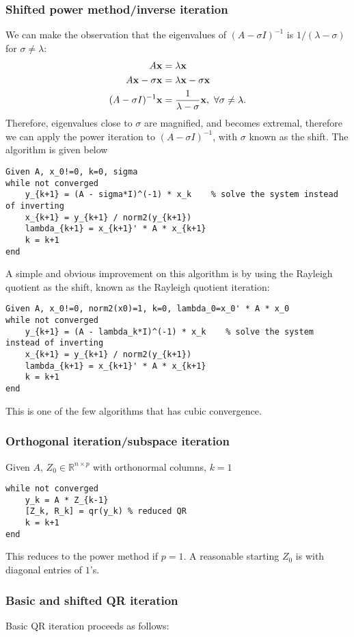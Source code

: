 \documentclass{article}
\begin{document}
\subsubsection{Shifted power method/inverse iteration}
We can make the observation that the eigenvalues of $(A-\sigma I)^{-1}$ is $1/(\lambda-\sigma)$ for $\sigma\neq\lambda$:
\begin{align}
    A\bvec{x}&=\lambda\bvec{x}\\
    A\bvec{x}-\sigma\bvec{x}&=\lambda\bvec{x}-\sigma\bvec{x}\\
    (A-\sigma I)^{-1}\bvec{x}&=\frac{1}{\lambda-\sigma}\bvec{x},\ \forall\sigma\neq\lambda.
\end{align}
Therefore, eigenvalues close to $\sigma$ are magnified, and becomes extremal, therefore we can apply the power iteration to $(A-\sigma I)^{-1}$, with $\sigma$ known as the shift. The algorithm is given below
\begin{verbatim}
Given A, x_0!=0, k=0, sigma
while not converged
    y_{k+1} = (A - sigma*I)^(-1) * x_k    % solve the system instead of inverting
    x_{k+1} = y_{k+1} / norm2(y_{k+1})
    lambda_{k+1} = x_{k+1}' * A * x_{k+1}
    k = k+1
end
\end{verbatim}
A simple and obvious improvement on this algorithm is by using the Rayleigh quotient as the shift, known as the Rayleigh quotient iteration:
\begin{verbatim}
Given A, x_0!=0, norm2(x0)=1, k=0, lambda_0=x_0' * A * x_0
while not converged
    y_{k+1} = (A - lambda_k*I)^(-1) * x_k    % solve the system instead of inverting
    x_{k+1} = y_{k+1} / norm2(y_{k+1})
    lambda_{k+1} = x_{k+1}' * A * x_{k+1}
    k = k+1
end
\end{verbatim}
This is one of the few algorithms that has cubic convergence.

\subsubsection{Orthogonal iteration/subspace iteration}
Given $A$, $Z_0\in\mathbb{R}^{n\times p}$ with orthonormal columns, $k=1$
\begin{verbatim}
while not converged
    y_k = A * Z_{k-1}
    [Z_k, R_k] = qr(y_k) % reduced QR
    k = k+1
end
\end{verbatim}
This reduces to the power method if $p=1$. A reasonable starting $Z_0$ is with diagonal entries of $1$'s.

\subsubsection{Basic and shifted QR iteration}
Basic QR iteration proceeds as follows:
\end{document}

